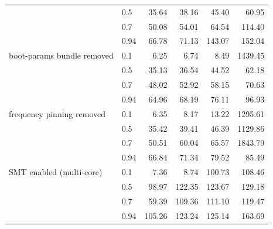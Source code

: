 \begin{tabular}{llrrrr}
 & 0.5 & 35.64 & 38.16 & 45.40 & 60.95 \\
 & 0.7 & 50.08 & 54.01 & 64.54 & 114.40 \\
 & 0.94 & 66.78 & 71.13 & 143.07 & 152.04 \\
\addlinespace
boot-params bundle removed & 0.1 & 6.25 & 6.74 & 8.49 & 1439.45 \\
 & 0.5 & 35.13 & 36.54 & 44.52 & 62.18 \\
 & 0.7 & 48.02 & 52.92 & 58.15 & 70.63 \\
 & 0.94 & 64.96 & 68.19 & 76.11 & 96.93 \\
\addlinespace
frequency pinning removed & 0.1 & 6.35 & 8.17 & 13.22 & 1295.61 \\
 & 0.5 & 35.42 & 39.41 & 46.39 & 1129.86 \\
 & 0.7 & 50.51 & 60.04 & 65.57 & 1843.79 \\
 & 0.94 & 66.84 & 71.34 & 79.52 & 85.49 \\
\addlinespace
SMT enabled (multi-core) & 0.1 & 7.36 & 8.74 & 100.73 & 108.46 \\
 & 0.5 & 98.97 & 122.35 & 123.67 & 129.18 \\
 & 0.7 & 59.39 & 109.36 & 111.10 & 119.47 \\
 & 0.94 & 105.26 & 123.24 & 125.14 & 163.69 \\
\bottomrule
\end{tabular}
